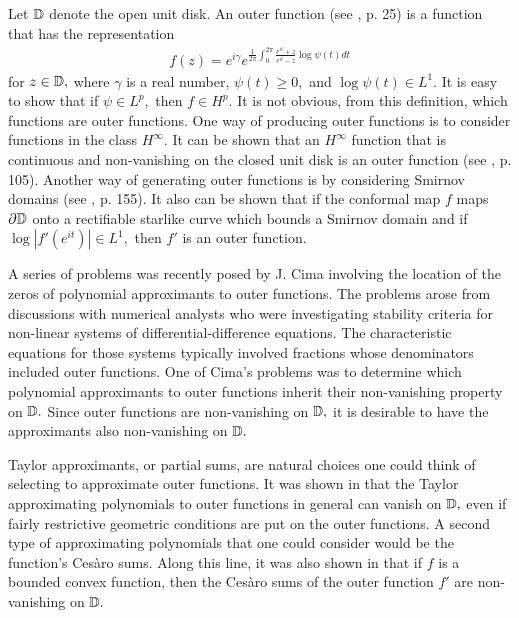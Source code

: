 \documentclass[final]{siamltex}
\begin{document}
Let ${\Bbb D}$ denote the open unit disk.  An outer function (see \cite{dur:hp}, p. 25) is a function that has the representation
\begin{eqnarray*}
f(z) = e^{i \gamma} e^{ \frac{1}{2 \pi} \int_{0}^{2 \pi} \frac{ e^{it}+z }{e^{it}-z} \log \psi(t)dt }
\end{eqnarray*} 
for $z \in {\Bbb D},$ where $\gamma$ is a real number, $\psi(t) \geq 0,$ and $\log \psi(t) \in {L}^{1}.$ It is easy to show that if $ \psi \in {L}^{p},$ then $f \in {H}^{p}.$  It is not obvious, from this definition,  which functions are outer functions. One way of producing outer functions is to consider functions in the class ${H}^{\infty}.$ It can be shown that an ${H}^{\infty}$ function that is continuous and non-vanishing on the closed unit disk is an outer function (see \cite{har}, p. 105).  Another way of generating outer functions is by considering Smirnov domains (see \cite{pom}, p. 155).  It also can be shown that if the conformal map $f$ maps $\partial {\Bbb D}$ onto a rectifiable starlike curve which bounds a Smirnov domain and if $\log \left| f'(e^{it}) \right| \in {L}^{1},$ then $f'$ is an outer function. 

 A series of problems was recently posed by J. Cima \cite{ci} involving the location of the zeros of polynomial approximants to outer functions.   The problems arose from discussions with numerical analysts who were investigating stability criteria for non-linear systems of differential-difference equations.  The characteristic equations for those systems typically involved fractions whose denominators included outer functions.   One of Cima's problems was to determine which polynomial approximants to outer functions inherit their non-vanishing property on ${\Bbb D}.$  Since outer functions are non-vanishing on ${\Bbb D},$ it is desirable to have the approximants also non-vanishing on ${\Bbb D}.$      

Taylor approximants, or partial sums, are natural choices one could think of selecting to approximate outer functions.  It was shown in \cite{bp} that the Taylor approximating polynomials to outer functions in general  can vanish on ${\Bbb D},$ even if fairly restrictive geometric conditions are put on the outer functions.   A second type of approximating polynomials that one could consider would be the function's Ces\`{a}ro sums.  Along this line, it was also shown in \cite{bp} that if $f$ is a bounded convex function, then the Ces\`{a}ro sums of the outer function $f'$  are non-vanishing on ${\Bbb D}.$ 
\end{document}
